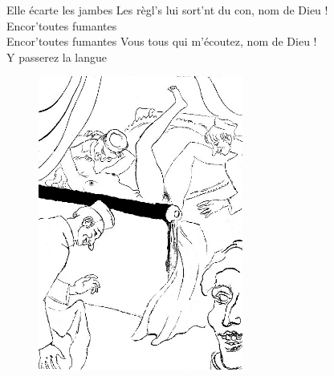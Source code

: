 {Elle écarte les jambes }
Les règl's lui sort'nt du con, nom de Dieu !
\\Encor'toutes fumantes 
\\
{Encor'toutes fumantes }
Vous tous qui m'écoutez, nom de Dieu !
\\Y passerez la langue 
\begin{figure}[h!]
\centering
   \includegraphics[width=0.6\textwidth]{images/ChansonHotelDieu.jpg}
 \end{figure}
\breakpage

